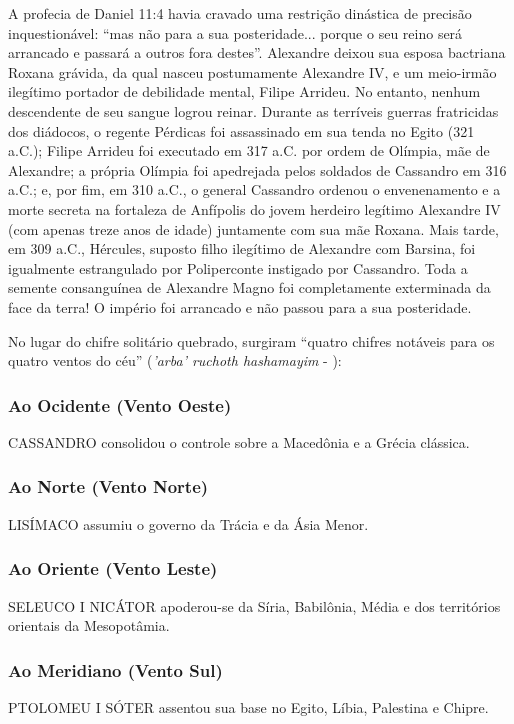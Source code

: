 \documentclass[11pt,a4paper,openany]{book}
\begin{document}
A profecia de Daniel 11:4 havia cravado uma restrição dinástica de precisão inquestionável: ``mas não para a sua posteridade... porque o seu reino será arrancado e passará a outros fora destes''.
Alexandre deixou sua esposa bactriana Roxana grávida, da qual nasceu postumamente Alexandre IV, e um meio-irmão ilegítimo portador de debilidade mental, Filipe Arrideu. No entanto, nenhum descendente de seu sangue logrou reinar. Durante as terríveis guerras fratricidas dos diádocos, o regente Pérdicas foi assassinado em sua tenda no Egito (321 a.C.); Filipe Arrideu foi executado em 317 a.C. por ordem de Olímpia, mãe de Alexandre; a própria Olímpia foi apedrejada pelos soldados de Cassandro em 316 a.C.; e, por fim, em 310 a.C., o general Cassandro ordenou o envenenamento e a morte secreta na fortaleza de Anfípolis do jovem herdeiro legítimo Alexandre IV (com apenas treze anos de idade) juntamente com sua mãe Roxana. Mais tarde, em 309 a.C., Hércules, suposto filho ilegítimo de Alexandre com Barsina, foi igualmente estrangulado por Poliperconte instigado por Cassandro. Toda a semente consanguínea de Alexandre Magno foi completamente exterminada da face da terra! O império foi arrancado e não passou para a sua posteridade.

No lugar do chifre solitário quebrado, surgiram ``quatro chifres notáveis para os quatro ventos do céu'' (\textit{'arba' ruchoth hashamayim} - ):

\subsubsection*{Ao Ocidente (Vento Oeste)}
CASSANDRO consolidou o controle sobre a Macedônia e a Grécia clássica.

\subsubsection*{Ao Norte (Vento Norte)}
LISÍMACO assumiu o governo da Trácia e da Ásia Menor.

\subsubsection*{Ao Oriente (Vento Leste)}
SELEUCO I NICÁTOR apoderou-se da Síria, Babilônia, Média e dos territórios orientais da Mesopotâmia.

\subsubsection*{Ao Meridiano (Vento Sul)}
PTOLOMEU I SÓTER assentou sua base no Egito, Líbia, Palestina e Chipre.
\end{document}
